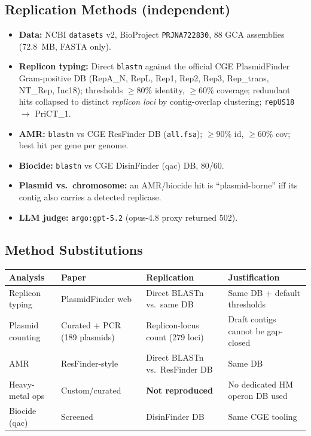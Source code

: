 \documentclass[11pt]{article}
\begin{document}
\subsection{Replication Methods (independent)}
\begin{itemize}[leftmargin=1.5em]
  \item \textbf{Data:} NCBI \texttt{datasets} v2, BioProject
        \texttt{PRJNA722830}, 88 GCA assemblies (72.8~MB, FASTA only).
  \item \textbf{Replicon typing:} Direct \texttt{blastn} against the
        official CGE PlasmidFinder Gram-positive DB (RepA\_N, RepL, Rep1,
        Rep2, Rep3, Rep\_trans, NT\_Rep, Inc18); thresholds
        $\geq 80\%$ identity, $\geq 60\%$ coverage; redundant hits collapsed
        to distinct \emph{replicon loci} by contig-overlap clustering;
        \texttt{repUS18} $\rightarrow$ PriCT\_1.
  \item \textbf{AMR:} \texttt{blastn} vs CGE ResFinder DB
        (\texttt{all.fsa}); $\geq 90\%$ id, $\geq 60\%$ cov; best hit per
        gene per genome.
  \item \textbf{Biocide:} \texttt{blastn} vs CGE DisinFinder (qac) DB,
        80/60.
  \item \textbf{Plasmid vs.\ chromosome:} an AMR/biocide hit is
        ``plasmid-borne'' iff its contig also carries a detected replicase.
  \item \textbf{LLM judge:} \texttt{argo:gpt-5.2} (opus-4.8 proxy returned
        502).
\end{itemize}

\subsection{Method Substitutions}
\begin{center}
\small
\begin{tabular}{@{}p{3.2cm}p{3.5cm}p{4cm}p{4cm}@{}}
\toprule
Analysis & Paper & Replication & Justification \\
\midrule
Replicon typing   & PlasmidFinder web  & Direct BLASTn vs.\ same DB     & Same DB + default thresholds \\
Plasmid counting  & Curated + PCR (189 plasmids) & Replicon-locus count (279 loci) & Draft contigs cannot be gap-closed \\
AMR               & ResFinder-style    & Direct BLASTn vs.\ ResFinder DB & Same DB \\
Heavy-metal ops   & Custom/curated     & \textbf{Not reproduced}         & No dedicated HM operon DB used \\
Biocide (qac)     & Screened           & DisinFinder DB                  & Same CGE tooling \\
\bottomrule
\end{tabular}
\end{center}
\end{document}
